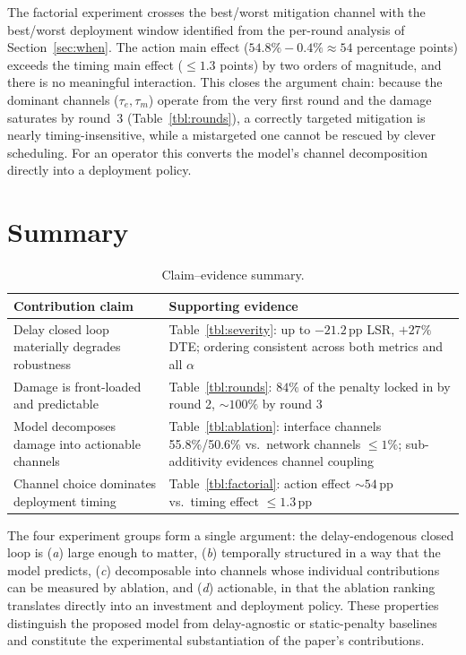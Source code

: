 \documentclass[a4paper,fleqn]{cas-dc}
\begin{document}
The factorial experiment crosses the best/worst mitigation channel with the
best/worst deployment window identified from the per-round analysis of
Section~\ref{sec:when}.  The action main effect ($54.8\%-0.4\% \approx 54$
percentage points) exceeds the timing main effect ($\le1.3$ points) by two
orders of magnitude, and there is no meaningful interaction.  This closes
the argument chain: because the dominant channels ($\tau_e,\tau_m$) operate
from the very first round and the damage saturates by round~3
(Table~\ref{tbl:rounds}), a correctly targeted mitigation is nearly
timing-insensitive, while a mistargeted one cannot be rescued by clever
scheduling.  For an operator this converts the model's channel
decomposition directly into a deployment policy.

\section{Summary}\label{sec:summary}

\begin{table}[t]
\caption{Claim--evidence summary.}\label{tbl:summary}
\centering
\begin{tabular}{@{}p{}p{}@{}}
\toprule
Contribution claim & Supporting evidence \\
\midrule
Delay closed loop materially degrades robustness &
Table~\ref{tbl:severity}: up to $-21.2$\,pp LSR, $+27\%$ DTE; ordering
consistent across both metrics and all $\alpha$ \\
\addlinespace
Damage is front-loaded and predictable &
Table~\ref{tbl:rounds}: $84\%$ of the penalty locked in by round 2,
${\sim}100\%$ by round 3 \\
\addlinespace
Model decomposes damage into actionable channels &
Table~\ref{tbl:ablation}: interface channels 55.8\%/50.6\% vs.\ network
channels $\le1\%$; sub-additivity evidences channel coupling \\
\addlinespace
Channel choice dominates deployment timing &
Table~\ref{tbl:factorial}: action effect ${\sim}54$\,pp vs.\ timing effect
$\le1.3$\,pp \\
\bottomrule
\end{tabular}
\end{table}

The four experiment groups form a single argument: the delay-endogenous
closed loop is (\emph{a}) large enough to matter, (\emph{b}) temporally
structured in a way that the model predicts, (\emph{c}) decomposable into
channels whose individual contributions can be measured by ablation, and
(\emph{d}) actionable, in that the ablation ranking translates directly
into an investment and deployment policy.  These properties distinguish the
proposed model from delay-agnostic or static-penalty baselines and
constitute the experimental substantiation of the paper's contributions.
\end{document}
